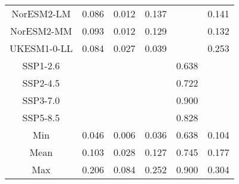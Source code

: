 \begin{table*}[t]
\begin{tabular}{c|rrr|rr}
NorESM2-LM & 0.086 & 0.012 & 0.137 &  & 0.141 \\
NorESM2-MM & 0.093 & 0.012 & 0.129 &  & 0.132 \\
UKESM1-0-LL & 0.084 & 0.027 & 0.039 &  & 0.253 \\
SSP1-2.6 &  &  &  & 0.638 &  \\
SSP2-4.5 &  &  &  & 0.722 &  \\
SSP3-7.0 &  &  &  & 0.900 &  \\
SSP5-8.5 &  &  &  & 0.828 &  \\
\midrule
Min & 0.046 & 0.006 & 0.036 & 0.638 & 0.104 \\
Mean & 0.103 & 0.028 & 0.127 & 0.745 & 0.177 \\
Max & 0.206 & 0.084 & 0.252 & 0.900 & 0.304 \\
\bottomrule
\end{tabular}
\end{table*}
